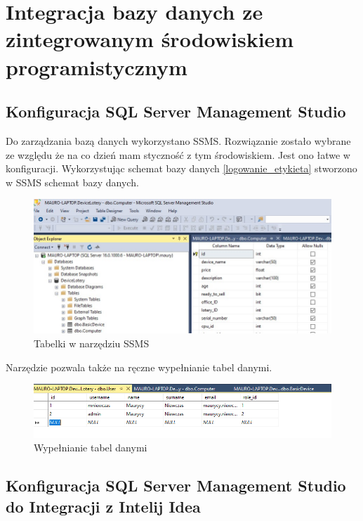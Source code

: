 \chapter{Integracja bazy danych ze zintegrowanym środowiskiem programistycznym}

\section{Konfiguracja SQL Server Management Studio}

Do zarządzania bazą danych wykorzystano SSMS. Rozwiązanie zostało wybrane ze względu że na co dzień mam styczność z tym środowiskiem. Jest ono łatwe w konfiguracji. Wykorzystując schemat bazy danych \ref{logowanie_etykieta} stworzono w SSMS schemat bazy danych. 
\begin{figure}[h]
		\centering
    \includegraphics[scale=0.6]{rys05/ssms_tabelki.jpg}
    \caption{Tabelki w narzędziu SSMS}
    \label{ssms_tabelki_etykieta}
\end{figure}

Narzędzie pozwala także na ręczne wypełnianie tabel danymi. 
\begin{figure}[h]
		\centering
    \includegraphics[scale=0.7]{rys05/dodawanie_tabel.png}
    \caption{Wypełnianie tabel danymi}
    \label{ssms_wypelnianie_tabel_etykieta}
\end{figure}

\newpage
\section{Konfiguracja SQL Server Management Studio do Integracji z Intelij Idea}

